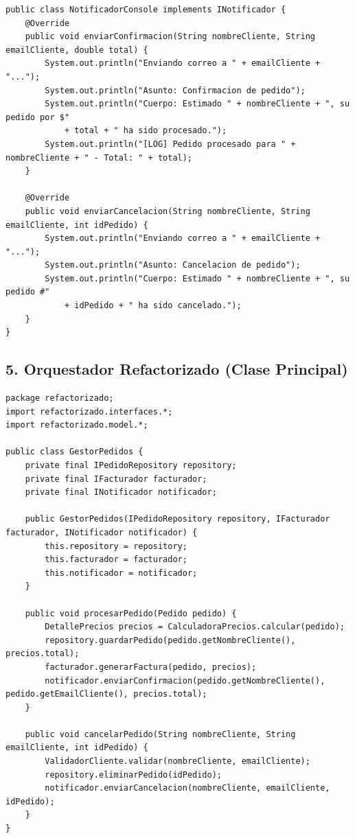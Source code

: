 \documentclass[12pt, a4paper]{article}
\begin{document}
\begin{lstlisting}[caption={Implementaciones Concretas}, label={lst:infraestructura}]
public class NotificadorConsole implements INotificador {
    @Override
    public void enviarConfirmacion(String nombreCliente, String emailCliente, double total) {
        System.out.println("Enviando correo a " + emailCliente + "...");
        System.out.println("Asunto: Confirmacion de pedido");
        System.out.println("Cuerpo: Estimado " + nombreCliente + ", su pedido por $"
            + total + " ha sido procesado.");
        System.out.println("[LOG] Pedido procesado para " + nombreCliente + " - Total: " + total);
    }

    @Override
    public void enviarCancelacion(String nombreCliente, String emailCliente, int idPedido) {
        System.out.println("Enviando correo a " + emailCliente + "...");
        System.out.println("Asunto: Cancelacion de pedido");
        System.out.println("Cuerpo: Estimado " + nombreCliente + ", su pedido #"
            + idPedido + " ha sido cancelado.");
    }
}
\end{lstlisting}

\newpage
\subsection{5. Orquestador Refactorizado (Clase Principal)}
\begin{lstlisting}[caption={Clase GestorPedidos Refactorizada}, label={lst:gestor_refactored}]
package refactorizado;
import refactorizado.interfaces.*;
import refactorizado.model.*;

public class GestorPedidos {
    private final IPedidoRepository repository;
    private final IFacturador facturador;
    private final INotificador notificador;

    public GestorPedidos(IPedidoRepository repository, IFacturador facturador, INotificador notificador) {
        this.repository = repository;
        this.facturador = facturador;
        this.notificador = notificador;
    }

    public void procesarPedido(Pedido pedido) {
        DetallePrecios precios = CalculadoraPrecios.calcular(pedido);
        repository.guardarPedido(pedido.getNombreCliente(), precios.total);
        facturador.generarFactura(pedido, precios);
        notificador.enviarConfirmacion(pedido.getNombreCliente(), pedido.getEmailCliente(), precios.total);
    }

    public void cancelarPedido(String nombreCliente, String emailCliente, int idPedido) {
        ValidadorCliente.validar(nombreCliente, emailCliente);
        repository.eliminarPedido(idPedido);
        notificador.enviarCancelacion(nombreCliente, emailCliente, idPedido);
    }
}
\end{lstlisting}
\end{document}
